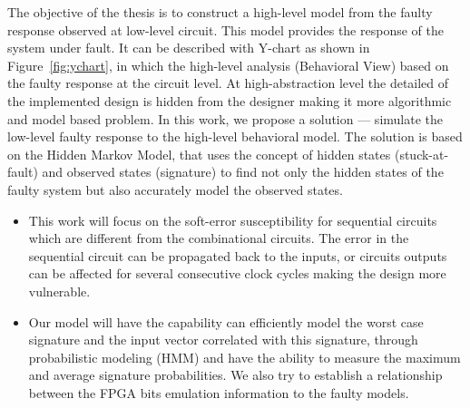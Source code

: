 The objective of the thesis is to construct a high-level model from the faulty response observed at low-level circuit. This model provides the response of the system under fault. It can be described with Y-chart as shown in Figure~\ref{fig:ychart}, in which the high-level analysis (Behavioral View) based on the faulty response at the circuit level. At high-abstraction level the detailed of the implemented design is hidden from the designer making it more algorithmic and model based problem. In this work, we propose a solution --- simulate the low-level faulty response to the high-level behavioral model. The solution is based on the Hidden Markov Model, that uses the concept of hidden states  (stuck-at-fault) and observed states (signature) to find not only the hidden states of the faulty system but also accurately model the observed states. 


\begin{itemize}


\item This work will focus on the soft-error susceptibility for sequential circuits which are different from the combinational circuits. The error in the sequential circuit can be propagated back to the inputs, or circuits outputs can be affected for several consecutive clock cycles making the design more vulnerable.  
\item Our model will have the capability can efficiently model the worst case signature and the input vector correlated with this signature, through probabilistic modeling (HMM) and have the ability to measure the maximum and average signature probabilities. We also try to establish a relationship between the FPGA bits emulation information to the faulty models.



\end{itemize}




